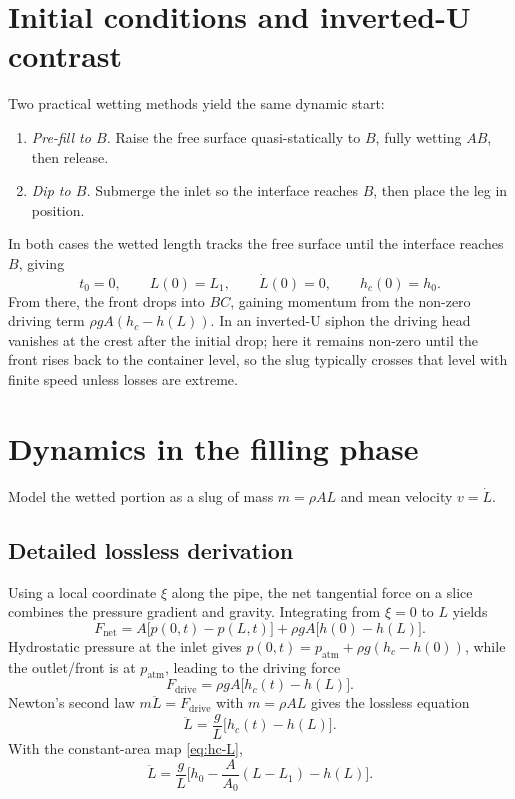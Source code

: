 \documentclass[11pt]{article}
\begin{document}
\section{Initial conditions and inverted-U contrast}
\label{sec:initial}
Two practical wetting methods yield the same dynamic start:
\begin{enumerate}
  \item \emph{Pre-fill to $B$.} Raise the free surface quasi-statically to $B$, fully wetting $AB$, then release.
  \item \emph{Dip to $B$.} Submerge the inlet so the interface reaches $B$, then place the leg in position.
\end{enumerate}
In both cases the wetted length tracks the free surface until the interface reaches $B$, giving
\begin{equation}
  t_0 = 0,\qquad L(0)=L_1,\qquad \dot L(0)=0,\qquad h_c(0)=h_0.
  \label{eq:IC}
\end{equation}
From there, the front drops into $BC$, gaining momentum from the non-zero driving term $\rho gA(h_c-h(L))$. In an inverted-U siphon the driving head vanishes at the crest after the initial drop; here it remains non-zero until the front rises back to the container level, so the slug typically crosses that level with finite speed unless losses are extreme.

\section{Dynamics in the filling phase}
\label{sec:filling}
Model the wetted portion as a slug of mass $m=\rho A L$ and mean velocity $v=\dot L$.

\subsection{Detailed lossless derivation}
Using a local coordinate $\xi$ along the pipe, the net tangential force on a slice combines the pressure gradient and gravity. Integrating from $\xi=0$ to $L$ yields
\[
  F_{\text{net}} = A\bigl[p(0,t)-p(L,t)\bigr] + \rho g A \bigl[h(0)-h(L)\bigr].
\]
Hydrostatic pressure at the inlet gives $p(0,t)=p_{\mathrm{atm}}+\rho g(h_c-h(0))$, while the outlet/front is at $p_{\mathrm{atm}}$, leading to the driving force
\begin{equation}
  F_{\text{drive}} = \rho g A\bigl[h_c(t) - h(L)\bigr].
  \label{eq:Fdrive}
\end{equation}
Newton's second law $m\ddot L = F_{\text{drive}}$ with $m=\rho A L$ gives the lossless equation
\begin{equation}
  \ddot L = \frac{g}{L}\bigl[h_c(t)-h(L)\bigr].
  \label{eq:filling-lossless-raw}
\end{equation}
With the constant-area map \eqref{eq:hc-L},
\begin{equation}
  \ddot L
  = \frac{g}{L}\Big[h_0 - \frac{A}{A_0}(L-L_1) - h(L)\Big].
  \label{eq:filling-lossless}
\end{equation}
\end{document}
